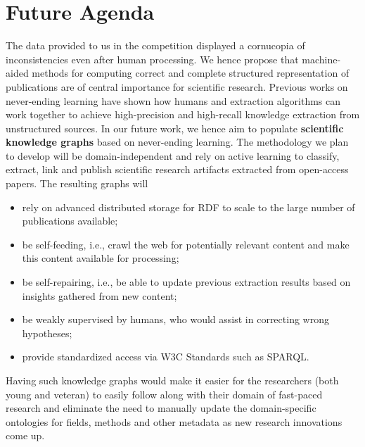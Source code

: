 \documentclass[runningheads]{llncs}
\begin{document}
\section{Future Agenda}
The data provided to us in the competition displayed a cornucopia of inconsistencies even after human processing. We hence propose that machine-aided methods for computing correct and complete structured representation of publications are of central importance for scientific research. Previous works on never-ending learning have shown how humans and extraction algorithms can work together to achieve high-precision and high-recall knowledge extraction from unstructured sources. In our future work, we hence aim to 
populate \textbf{scientific knowledge graphs} based on never-ending learning. The methodology we plan to develop will be domain-independent and rely on active learning to classify, extract, link and publish scientific research artifacts extracted from open-access papers.  %
The resulting graphs will
\begin{itemize}
    \item rely on advanced distributed storage for RDF to scale to the large number of publications available;
    \item be self-feeding, i.e., crawl the web for potentially relevant content and make this content available for processing;
    \item be self-repairing, i.e., be able to update previous extraction results based on insights gathered from new content;
    \item be weakly supervised by humans, who would assist in correcting wrong hypotheses;
    \item provide standardized access via W3C Standards such as SPARQL.
\end{itemize}

Having such knowledge graphs would make it easier for the researchers (both young and veteran) to easily follow along with their domain of fast-paced research and eliminate the need to manually update the domain-specific ontologies for fields, methods and other metadata as new research innovations come up. 
\end{document}

